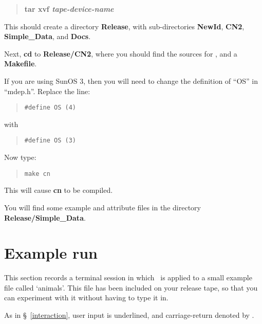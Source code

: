 \begin{quotation}
\bf     tar xvf {\it tape-device-name}
\end{quotation}

   This should create a directory {\bf Release}, with
sub-directories {\bf NewId}, {\bf CN2}, {\bf Simple\_Data}, 
and {\bf Docs}.

Next, {\bf cd} to {\bf Release/CN2}, where you should find the
sources for \CN, and a {\bf Makefile}.

  If you are using SunOS 3, then you will need to change
the definition of ``OS'' in ``mdep.h''. Replace the line:

\vspace{-3ex}
\begin{quotation}
\verb+#define OS (4)+
\end{quotation}
\vspace{-3ex}

with 

\vspace{-3ex}
\begin{quotation}
\verb+#define OS (3)+
\end{quotation}
\vspace{-3ex}

Now type:

\vspace{-3ex}
\begin{quotation}
\verb+make cn+
\end{quotation}
\vspace{-3ex}

This will cause {\bf cn} to be compiled.

You will find some example and attribute files in the directory
{\bf Release/Simple\_Data}.


\section{Example run}
\label{script}

This section records a terminal session in which \CN\ is applied
to a small example file called `animals'.  This file has been
included on your release tape, so that you can experiment with
it without having to type it in. 

As in \S~\ref{interaction}, user input is underlined, and
carriage-return denoted by \ret.

